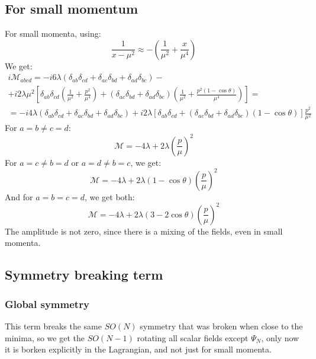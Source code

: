 \documentclass{article}
\begin{document}
\subsection{For small momentum}
For small momenta, using:
\begin{equation}
    \frac{1}{x - \mu^2} \approx -\left(\frac{1}{\mu^2} + \frac{x}{\mu^4}\right)
\end{equation}
We get:
\begin{equation}
\begin{gathered}
    i\mathcal{M}_{abcd} = -i6\lambda\left(\delta_{ab}\delta_{cd} + \delta_{ac}\delta_{bd} + \delta_{ad}\delta_{bc}\right) - \\ + i2\lambda\mu^2 \left[\delta_{ab}\delta_{cd}\left(\frac{1}{\mu^2} + \frac{p^2}{\mu^4}\right) + \left(\delta_{ac}\delta_{bd} + \delta_{ad}\delta_{bc}\right)\left(
        \frac{1}{\mu^2} + \frac{p^2\left(1 - \cos\theta\right)}{\mu^4}
    \right)\right] = \\ =
     -i4\lambda\left(\delta_{ab}\delta_{cd} + \delta_{ac}\delta_{bd} + \delta_{ad}\delta_{bc}\right) + i2\lambda \left[\delta_{ab}\delta_{cd} + \left(\delta_{ac}\delta_{bd} + \delta_{ad}\delta_{bc}\right)\left(1 - \cos\theta\right)
    \right]\frac{p^2}{\mu^2}
\end{gathered}
\end{equation}
For $a = b \ne c = d$:
\begin{equation}
    \mathcal{M} = -4\lambda + 2\lambda \left(\frac{p}{\mu}\right)^2
\end{equation}
For $a = c \ne b = d$ or $a = d \ne b = c$, we get:
\begin{equation}
    \mathcal{M} = -4\lambda + 2\lambda\left(1 - \cos\theta\right)\left(\frac{p}{\mu}\right)^2
\end{equation}
And for $a = b = c = d$, we get both:
\begin{equation}
    \mathcal{M} = -4\lambda + 2\lambda\left(3 - 2\cos\theta\right)\left(\frac{p}{\mu}\right)^2
\end{equation}
The amplitude is not zero, since there is a mixing of the fields, even in small momenta.
\subsection{Symmetry breaking term}
\subsubsection{Global symmetry}
This term breaks the same $SO(N)$ symmetry that was broken when close to the minima, so we get the $SO(N-1)$ rotating all scalar fields except $\Psi_N$, only now it is borken explicitly in the Lagrangian, and not just for small momenta.
\end{document}
